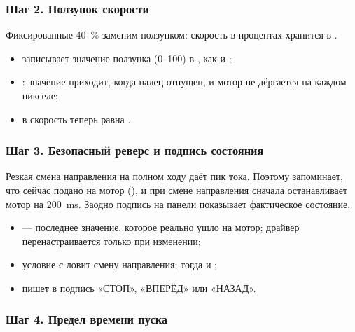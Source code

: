 \subsubsection{Шаг 2. Ползунок скорости}

Фиксированные \SI{40}{\percent} заменим ползунком: скорость в процентах хранится в .


\begin{itemize}[leftmargin=*]
  \item {} записывает значение ползунка (0--100) в , как и ;
  \item {}: значение приходит, когда палец отпущен, и мотор не дёргается на каждом пикселе;
  \item в  скорость теперь равна .
\end{itemize}

\subsubsection{Шаг 3. Безопасный реверс и подпись состояния}

Резкая смена направления на полном ходу даёт пик тока. Поэтому  запоминает, что сейчас
подано на мотор (), и при смене направления сначала останавливает мотор на \SI{200}{ms}.
Заодно подпись на панели показывает фактическое состояние.


\begin{itemize}[leftmargin=*]
  \item {} --- последнее значение, которое реально ушло на мотор; драйвер перенастраивается только при изменении;
  \item условие с  ловит смену направления; тогда  и ;
  \item {} пишет в подпись «СТОП», «ВПЕРЁД» или «НАЗАД».
\end{itemize}

\subsubsection{Шаг 4. Предел времени пуска}

